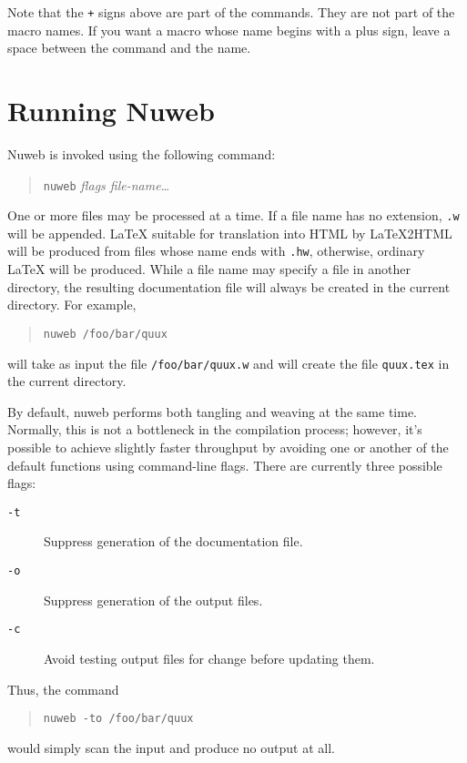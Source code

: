 \documentclass{report}
\begin{document}
Note that the \verb"+" signs above are part of the commands. They
are not part of the macro names. If you want a macro whose name
begins with a plus sign, leave a space between the command and the
name.

\section{Running Nuweb}

Nuweb is invoked using the following command:
\begin{quote}
{\tt nuweb} {\em flags file-name}\ldots
\end{quote}
One or more files may be processed at a time. If a file name has no
extension, \verb|.w| will be appended.  {\LaTeX} suitable for
translation into HTML by {\LaTeX}2HTML will be produced from
files whose name ends with \verb|.hw|, otherwise, ordinary {\LaTeX} will be
produced.  While a file name may specify a file in another directory,
the resulting documentation file will always be created in the current
directory. For example,
\begin{quote}
{\tt nuweb /foo/bar/quux}
\end{quote}
will take as input the file \verb|/foo/bar/quux.w| and will create the
file \verb|quux.tex| in the current directory.

By default, nuweb performs both tangling and weaving at the same time.
Normally, this is not a bottleneck in the compilation process;
however, it's possible to achieve slightly faster throughput by
avoiding one or another of the default functions using command-line
flags. There are currently three possible flags:
\begin{description}
\item[\tt -t] Suppress generation of the documentation file.
\item[\tt -o] Suppress generation of the output files.
\item[\tt -c] Avoid testing output files for change before updating them.
\end{description}
Thus, the command
\begin{quote}
\verb|nuweb -to /foo/bar/quux|
\end{quote}
would simply scan the input and produce no output at all.
\end{document}
